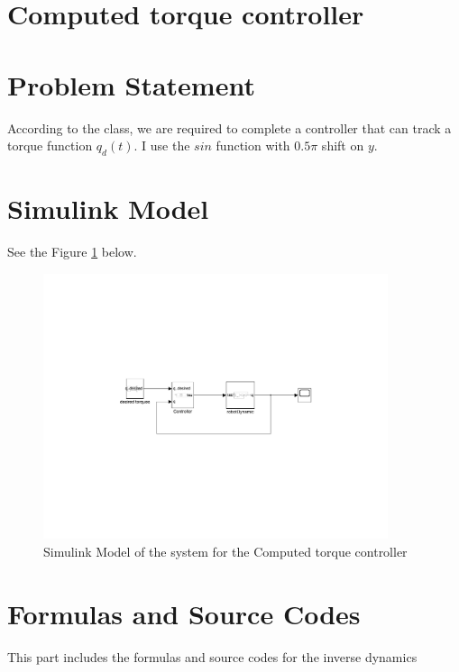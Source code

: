 \documentclass{article}
\begin{document}
\newpage

\section*{\centering \Huge Computed torque controller}

\section*{Problem Statement}

According to the class, we are required to complete a controller that can track a torque function $q_d(t)$. I use the $sin$ function with $0.5 \pi$ shift on $y$.

\section{Simulink Model}
See the Figure \ref{fig:model_computed} below.
\begin{figure}[ht]
    \centering
    \includegraphics[width=0.9\textwidth]{figures/model_computed.pdf}
    \caption{Simulink Model of the system for the Computed torque controller}
    \label{fig:model_computed}
\end{figure}

\section{Formulas and Source Codes}
This part includes the formulas and source codes for the inverse dynamics
\end{document}
